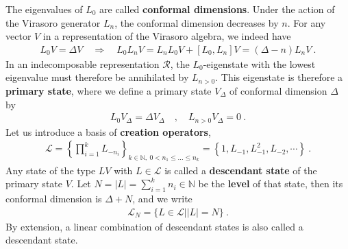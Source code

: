 \documentclass[12pt, a4paper]{article}
\newcommand{\myindex}[1]{\textbf{\boldmath #1}}
\theoremstyle{break}
\begin{document}
The eigenvalues of $L_0$ are called \myindex{conformal dimensions}. Under the action of the Virasoro generator $L_n$, the conformal dimension decreases by $n$. For any vector $V$ in a representation of the Virasoro algebra, we indeed have 
\begin{align}
 L_0V{} = \Delta V{} \quad \Rightarrow\quad  L_0 L_nV{} = L_nL_0V{} + [L_0, L_n] V{}  = (\Delta-n)L_nV{} \ .
\end{align}
In an indecomposable representation $\mathcal{R}$, the $L_0$-eigenstate with the lowest eigenvalue must therefore be annihilated by $L_{n>0}$. This eigenstate is therefore a \myindex{primary state}, where we define a primary state $V_\Delta$ of conformal dimension $\Delta$ by 
\begin{align}
  \boxed{L_0 V_\Delta = \Delta V_\Delta \quad , \quad L_{n>0} V_\Delta = 0}\ .
 \end{align}
Let us introduce a basis of \myindex{creation operators},
\begin{align}
 \mathcal{L} = \left\{\prod_{i=1}^k L_{-n_i} \right\}_{k\in\mathbb{N},\ 0<n_1\leq \dots \leq n_k}=\left\{1, L_{-1}, L_{-1}^2, L_{-2},\cdots \right\}\ .
 \label{lcm}
\end{align}
Any state of the type $L V{}$ with $L\in\mathcal{L}$ is called a \myindex{descendant state} of the primary state $V$. Let  $N=|L|=\sum_{i=1}^k n_i \in\mathbb{N}$ be the  \myindex{level} of that state, then its conformal dimension is $\Delta+N$, and we write
\begin{align}
 \mathcal{L}_N = \Big\{ L\in\mathcal{L}\Big| |L|=N\Big\}\ . 
\label{ln}
 \end{align}
By extension, a linear combination of descendant states is also called a descendant state. 
\end{document}
